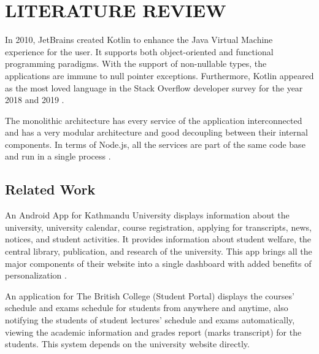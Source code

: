 \chapter{LITERATURE REVIEW}

In 2010, JetBrains created Kotlin to enhance the Java Virtual Machine experience for the user. It supports both object-oriented and functional programming paradigms. With the support of non-nullable types, the applications are immune to null pointer exceptions. Furthermore, Kotlin appeared as the most loved language in the Stack Overflow developer survey for the year 2018 and 2019 \cite{oliveira2020adoption}.

The monolithic architecture has every service of the application interconnected and has a very modular architecture and good decoupling between their internal components. In terms of Node.js, all the services are part of the same code base and run in a single process \cite{casciaro2020nodejs}.

\section{Related Work}
An Android App for Kathmandu University displays information about the university, university calendar, course registration, applying for transcripts, news, notices, and student activities. It provides information about student welfare, the central library, publication, and research of the university. This app brings all the major components of their website into a single dashboard with added benefits of personalization \cite{kathmandu2025app}.

An application for The British College (Student Portal) displays the courses’ schedule and exams schedule for students from anywhere and anytime, also notifying the students of student lectures’ schedule and exams automatically, viewing the academic information and grades report (marks transcript) for the students. This system depends on the university website directly.
